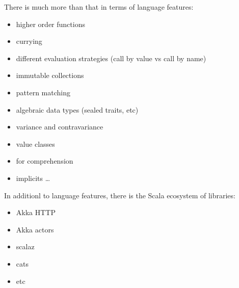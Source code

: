 \documentclass[10pt]{beamer}
\providecommand{\eg}{e.\,g.}
\begin{document}

\begin{frame}
There is much more than that in terms of language features:
\begin{itemize}
 \item higher order functions 
\item currying 
\item different evaluation strategies (call by value vs call by name) 
\item immutable collections 
\item pattern matching 
\item algebraic data types (sealed traits, etc)
\item variance and contravariance 
\item value classes 
\item for comprehension 
\item implicits \ldots 
\end{itemize}
\end{frame}

\begin{frame}
In additionl to language features, there is the Scala ecosystem  of libraries:
\begin{itemize}
\item Akka HTTP
\item Akka actors
\item scalaz 
\item cats
\item etc
\end{itemize}
\end{frame}
\end{document}
